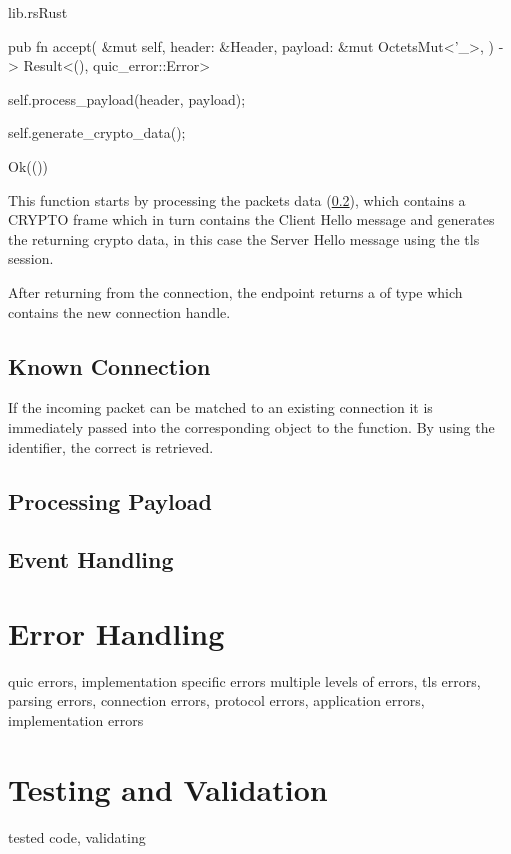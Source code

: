 \begin{codeblock}{lib.rs}{Rust}
    \begin{rustcode}
        pub fn accept(
            &mut self,
            header: &Header,
            payload: &mut OctetsMut<'_>,
        ) -> Result<(), quic_error::Error> {
            self.process_payload(header, payload);

            self.generate_crypto_data();

            Ok(())
        }
    \end{rustcode}
\end{codeblock}

This function starts by processing the packets data (\ref{process_payload}), which contains a CRYPTO frame which in turn
contains the Client Hello message and generates the returning crypto data, in this case the Server Hello message using
the tls session.

After returning from the connection, the endpoint returns a  of type  which
contains the new connection handle.

\subsection{Known Connection} \label{known_conn}

If the incoming packet can be matched to an existing connection it is immediately passed into the corresponding object to
the  function. By using the  identifier, the correct 
is retrieved.

\subsection{Processing Payload} \label{process_payload}


\subsection{Event Handling}



\section{Error Handling}

quic errors, implementation specific errors
multiple levels of errors, tls errors, parsing errors, connection errors, protocol errors, application errors, implementation errors

\section{Testing and Validation}

tested code, validating